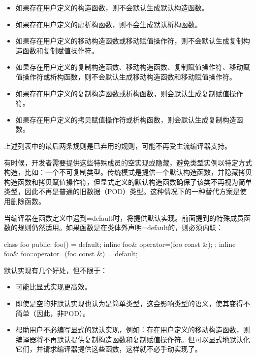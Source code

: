 \begin{itemize}
\item
如果存在用户定义的构造函数，则不会默认生成默认构造函数。

\item
如果存在用户定义的虚析构函数，则不会生成默认析构函数。

\item
如果存在用户定义的移动构造函数或移动赋值操作符，则不会默认生成复制构造函数和复制赋值操作符。

\item
如果存在用户定义的复制构造函数、移动构造函数、复制赋值操作符、移动赋值操作符或析构函数，则不会默认生成移动构造函数和移动赋值操作符。

\item
如果存在用户定义的复制构造函数或析构函数，则会默认生成复制赋值操作符。

\item
如果存在用户定义的拷贝赋值操作符或析构函数，则会默认生成复制构造函数。
\end{itemize}

\begin{myNotic}
上述列表中的最后两条规则是已弃用的规则，可能不再受主流编译器支持。
\end{myNotic}

有时候，开发者需要提供这些特殊成员的空实现或隐藏，避免类型实例以特定方式构造，比如：一个不可复制类型。传统模式是提供一个默认构造函数，并隐藏拷贝构造函数和拷贝赋值操作符，但显式定义的默认构造函数确保了该类不再视为简单类型，因此不再是普通的旧数据（POD）类型。这种情况下的一种替代方案是使用删除函数。

当编译器在函数定义中遇到=default时，将提供默认实现。前面提到的特殊成员函数的规则仍然适用。如果函数是在类体外声明=default的，则必须内联：

\begin{cpp}
class foo
{
public:
    foo() = default;
    inline foo& operator=(foo const &);
};
inline foo& foo::operator=(foo const &) = default;
\end{cpp}

默认实现有几个好处，但不限于：

\begin{itemize}
\item
可能比显式实现更高效。

\item
即使是空的非默认实现也认为是简单类型，这会影响类型的语义，使其变得不简单（因此，非POD）。

\item
帮助用户不必编写显式的默认实现，例如：存在用户定义的移动构造函数，则编译器将不再默认提供复制构造函数和复制赋值操作符。但可以显式地默认化它们，并请求编译器提供这些函数，这样就不必手动实现了。
\end{itemize}


